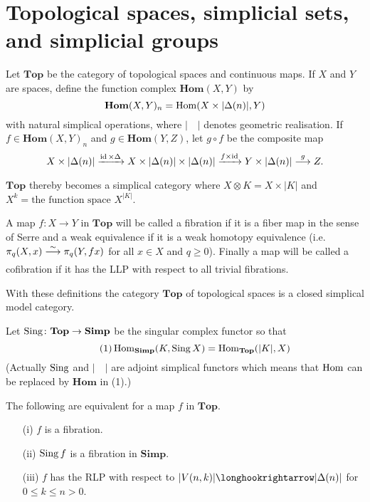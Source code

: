 \documentclass[../main]{subfiles}
\begin{document}
\section{Topological spaces, simplicial sets, and simplicial groups}\label{sec:2.3}
Let $\mathbf{Top}$ be the category of topological spaces and continuous maps. If $X$ and $Y$ are spaces, define the function complex $\mathbf {Hom}(X, Y)$ by \[\mathbf {Hom}(X, Y)_n = \operatorname{Hom}(X \times |\Delta(n)|, Y)\] with natural simplical operations, where $|\quad|$ denotes geometric realisation. If $f \in \mathbf {Hom}(X, Y)_n$ and $g \in \mathbf{Hom}(Y, Z)$, let $g \circ f$ be the composite map 
\[
X \times |\Delta(n)| \varrightarrow{\id \times \Delta} X \times |\Delta(n)| \times |\Delta(n)| \varrightarrow{f \times \id} Y \times |\Delta(n)| \varrightarrow{g} Z.
\]
$\mathbf{Top}$ thereby becomes a simplical category where $X \otimes K = X \times |K|$ and \\$X^k = \text {the function space } X^{|K|}$. 

A map $f \colon X \to Y$ in $\mathbf{Top}$ will be called a fibration if it is a fiber map in the sense of Serre and a weak equivalence if it is a weak homotopy equivalence (i.e. $\pi_q(X, x) \varrightarrow{\sim} \pi_q(Y, fx)$ for all $x \in X$ and $q \ge 0$). Finally a map will be called a cofibration if it has the LLP with respect to all trivial fibrations. 

\begin{theorem}
\label{thm:2.3.1}
With these definitions the category $\mathbf{Top}$ of topological spaces is a closed simplical model category. 

Let $\operatorname{Sing} \colon \mathbf{Top} \to \mathbf{Simp}$ be the singular complex functor so that 
\[
\tag{1}
\operatorname{Hom}_{\mathbf{Simp}} (K, \operatorname{Sing} X) = \operatorname{Hom}_{\mathbf{Top}}(|K|, X)
\]
(Actually $\operatorname{Sing}$ and $|\quad|$ are adjoint simplical functors which means that $\operatorname{Hom}$ can be replaced by $\mathbf {Hom}$ in (1).)
\end{theorem} 

\begin{lemma}
\label{lem:2.3.1}
The following are equivalent for a map $f$ in $\mathbf{Top}$. 
\begin{enumerate}
    \item[(i)] $f$ is a fibration.
    \item[(ii)] $\operatorname{Sing} f$ is a fibration in $\mathbf{Simp}$.
    \item[(iii)] $f$ has the RLP with respect to $|V(n, k)| \longhookrightarrow |\Delta(n)|$ for $0 \le k \le n > 0$.
\end{enumerate} 
\end{lemma} 
\end{document}
